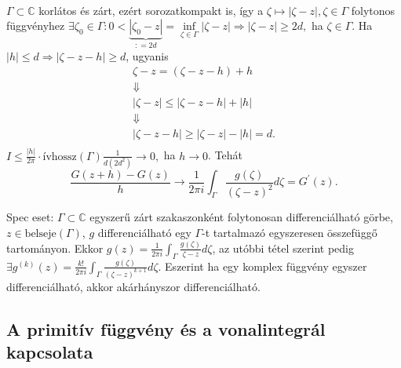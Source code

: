 \documentclass[12pt,a4paper]{scrartcl}
\newenvironment{bizonyitas}{}{}
\begin{document}
\begin{bizonyitas}
\[\begin{aligned}
\end{aligned} \] \(\Gamma \subset {\mathbb{C}}\) korlátos és zárt, ezért
sorozatkompakt is, így a
\(\left. \zeta\mapsto\left| {\zeta - z} \right|,\zeta \in \Gamma \right.\)
folytonos függvényhez
\(\exists {\zeta _0} \in \Gamma :0 < \underbrace {\left| {{\zeta _0} - z} \right|}_{: = 2d} = \mathop {\inf }\limits_{\zeta \in \Gamma } \left| {\zeta - z} \right| \Rightarrow \left| {\zeta - z} \right| \geqslant 2d,\)
ha \(\zeta \in \Gamma\). Ha
\(\left. \left| h \right| \leq d\Rightarrow\left| {\zeta - z - h} \right| \geq d \right.\),
ugyanis \[\begin{gathered}
  \zeta  - z = \left( {\zeta  - z - h} \right) + h \\ 
   \Downarrow  \\ 
  \left| {\zeta  - z} \right| \leqslant \left| {\zeta  - z - h} \right| + \left| h \right| \\ 
   \Downarrow  \\ 
  \left| {\zeta  - z - h} \right| \geqslant \left| {\zeta  - z} \right| - \left| h \right| = d .\\ 
\end{gathered} \]
\(I \leqslant \frac{{\left| h \right|}}{{2\pi }} \cdot \text{ívhossz} \left( \Gamma \right)\frac{1}{{d\left( {2{d^2}} \right)}} \to 0,\)
ha \(\left. h\rightarrow 0 \right.\). Tehát
\[\left. \frac{G\left( {z + h} \right) - G\left( z \right)}{h}\rightarrow\frac{1}{2\pi i}{\int_{\Gamma}{\frac{g\left( \zeta \right)}{\left( {\zeta - z} \right)^{2}}d\zeta}} = G^{\prime}{\left( z \right).} \right.\]

\end{bizonyitas}

Spec eset: \(\Gamma \subset {\mathbb{C}}\) egyszerű zárt szakaszonként
folytonosan differenciálható görbe,
\(z \in \text{belseje}\left( \Gamma \right)\), \(g\) differenciálható
egy \(\Gamma\)-t tartalmazó egyszeresen összefüggő tartományon. Ekkor
\(g\left( z \right) = \frac{1}{2\pi i}{\int_{\Gamma}{\frac{g\left( \zeta \right)}{\zeta - z}d\zeta}}\),
az utóbbi tétel szerint pedig
\(\exists g^{(k)}\left( z \right) = \frac{k!}{2\pi i}{\int_{\Gamma}{\frac{g\left( \zeta \right)}{\left( {\zeta - z} \right)^{k + 1}}d\zeta}}\).
Eszerint ha egy komplex függvény egyszer differenciálható, akkor
akárhányszor differenciálható.

\hypertarget{a-primitiv-fuggveny-es-a-vonalintegral-kapcsolata}{%
\subsection{A primitív függvény és a vonalintegrál
kapcsolata}\label{a-primitiv-fuggveny-es-a-vonalintegral-kapcsolata}}
\end{document}
